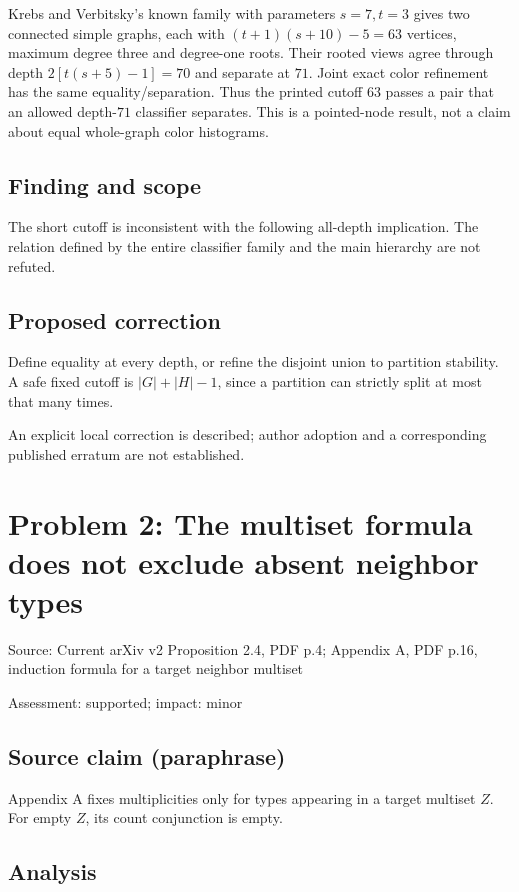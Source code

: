 \documentclass[11pt]{article}
\begin{document}
Krebs and Verbitsky’s known family with parameters \(s=7,t=3\) gives two connected simple graphs, each with \((t+1)(s+10)-5=63\) vertices, maximum degree three and degree-one roots. Their rooted views agree through depth \(2[t(s+5)-1]=70\) and separate at \(71\). Joint exact color refinement has the same equality/separation. Thus the printed cutoff \(63\) passes a pair that an allowed depth-\(71\) classifier separates. This is a pointed-node result, not a claim about equal whole-graph color histograms.

\subsection*{Finding and scope}

The short cutoff is inconsistent with the following all-depth implication. The relation defined by the entire classifier family and the main hierarchy are not refuted.

\subsection*{Proposed correction}

Define equality at every depth, or refine the disjoint union to partition stability. A safe fixed cutoff is \(|G|+|H|-1\), since a partition can strictly split at most that many times.

An explicit local correction is described; author adoption and a corresponding published erratum are not established.

\section*{Problem 2: The multiset formula does not exclude absent neighbor types}

Source: Current arXiv v2 Proposition 2.4, PDF p.4; Appendix A, PDF p.16, induction formula for a target neighbor multiset

Assessment: supported; impact: minor

\subsection*{Source claim (paraphrase)}

Appendix A fixes multiplicities only for types appearing in a target multiset \(Z\). For empty \(Z\), its count conjunction is empty.

\subsection*{Analysis}
\end{document}
